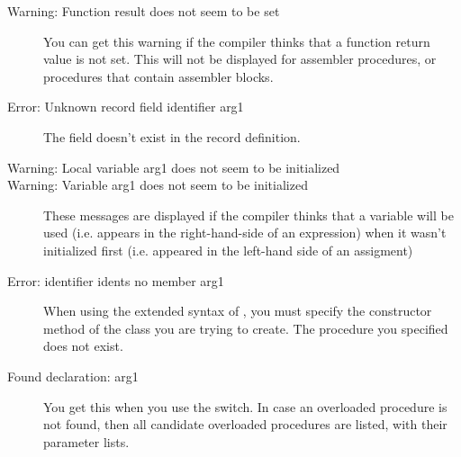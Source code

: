 \begin{description}
\item [Warning: Function result does not seem to be set]
 You can get this warning if the compiler thinks that a function return
 value is not set. This will not be displayed for assembler procedures,
 or procedures that contain assembler blocks.
\item [Error: Unknown record field identifier arg1]
 The field doesn't exist in the record definition.
\item [Warning: Local variable arg1 does not seem to be initialized]
\item [Warning: Variable arg1 does not seem to be initialized]
 These messages are displayed if the compiler thinks that a variable will
 be used (i.e. appears in the right-hand-side of an expression) when it
 wasn't initialized first (i.e. appeared in the left-hand side of an
 assigment)
\item [Error: identifier idents no member arg1]
 When using the extended syntax of , you must specify the constructor
 method of the class you are trying to create. The procedure you specified
 does not exist.
\item [Found declaration: arg1]
 You get this when you use the  switch. In case an overloaded
 procedure is not found, then all candidate overloaded procedures are
 listed, with their parameter lists.
 \end{description}
